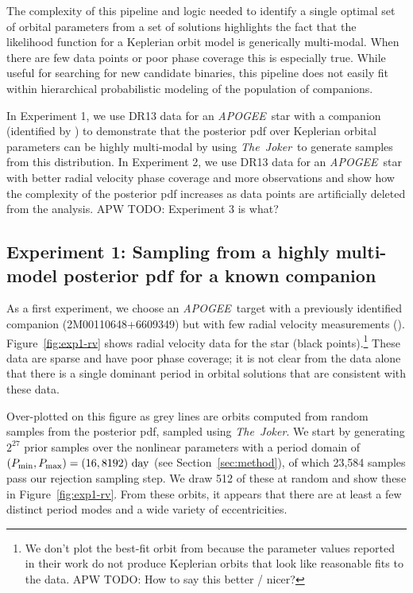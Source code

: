 \documentclass[manuscript, letterpaper]{aastex6}
\newcommand{\project}[1]{\textsl{#1}}
\newcommand{\acronym}[1]{{\small{#1}}}
\newcommand{\apogee}{\project{\acronym{APOGEE}}}
\newcommand{\samplername}{\project{The~Joker}}
\newcommand{\todoapw}[1]{{\color{red}APW TODO: #1}}
\begin{document}
The complexity of this pipeline and logic needed to identify a single optimal
set of orbital parameters from a set of solutions highlights the fact that the
likelihood function for a Keplerian orbit model is generically multi-modal.
When there are few data points or poor phase coverage this is especially true.
While useful for searching for new candidate binaries, this pipeline does not
easily fit within hierarchical probabilistic modeling of the population of
companions.

In Experiment 1, we use DR13 data for an \apogee\ star with a companion
(identified by \citealt{Troup:2016}) to demonstrate that the posterior pdf over
Keplerian orbital parameters can be highly multi-modal by using \samplername\
to generate samples from this distribution.
In Experiment 2, we use DR13 data for an \apogee\ star with better radial
velocity phase coverage and more observations and show how the complexity of
the posterior pdf increases as data points are artificially deleted from the
analysis.
\todoapw{Experiment 3 is what?}

\subsection{Experiment 1: Sampling from a highly multi-model posterior pdf for
a known companion}

As a first experiment, we choose an \apogee\ target with a previously
identified companion (2M00110648+6609349) but with few radial velocity
measurements (\citealt{Troup:2016}).
Figure~\ref{fig:exp1-rv} shows radial velocity data for the star (black
points).\footnote{We don't plot the best-fit orbit from \citealt{Troup:2016}
because the parameter values reported in their work do not produce Keplerian
orbits that look like reasonable fits to the data.
\todoapw{How to say this better / nicer?}}
These data are sparse and have poor phase coverage; it is not clear from the
data alone that there is a single dominant period in orbital solutions that are
consistent with these data.

Over-plotted on this figure as grey lines are orbits computed from random
samples from the posterior pdf, sampled using \samplername. We start by
generating $2^{27}$ prior samples over the nonlinear parameters with a period
domain of $(P_{\rm min}, P_{\rm max}) = (16, 8192)~{\rm day}$ (see
Section~\ref{sec:method}), of which 23,584 samples pass our rejection sampling
step.
We draw 512 of these at random and show these in Figure~\ref{fig:exp1-rv}.
From these orbits, it appears that there are at least a few distinct period
modes and a wide variety of eccentricities.
\end{document}
